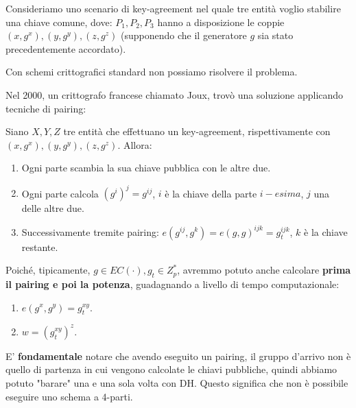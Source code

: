 \begin{problem}[3-party DH] Consideriamo uno scenario di key-agreement nel quale tre entità voglio stabilire una chiave comune, dove:
$P_1,P_2,P_3$ hanno a disposizione le coppie $(x,g^x),(y,g^y),(z,g^z)$ (supponendo che il generatore $g$ sia stato precedentemente accordato).
\begin{note}
Con schemi crittografici standard non possiamo risolvere il problema.
\end{note}
Nel 2000, un crittografo francese chiamato Joux, trovò una soluzione applicando tecniche di pairing:
\begin{solution}
\begin{theorem}\label{thm:dh3}
Siano $X,Y,Z$ tre entità che effettuano un key-agreement, rispettivamente con  $(x,g^x),(y,g^y),(z,g^z)$. Allora:
\begin{enumerate}
    \item Ogni parte scambia la sua chiave pubblica con le altre due.
    \item Ogni parte calcola $(g^i)^j=g^{ij}$, $i$ è la chiave della parte $i-esima$, $j$ una delle altre due.
    \item Successivamente tremite pairing: $e(g^{ij},g^k)=e(g,g)^{ijk}=g_t^{ijk}$, $k$ è la chiave restante.
\end{enumerate}
\begin{remark}
Poiché, tipicamente, $g\in{EC(\cdot)},g_t\in{Z_p^*}$, avremmo potuto anche calcolare \textbf{prima il pairing e poi la potenza}, guadagnando a livello di tempo computazionale:
\begin{enumerate}
    \item $e(g^x,g^y)=g_t^{xy}$.
    \item $w=(g_t^{xy})^z$.
\end{enumerate}
\end{remark}
\end{theorem}
\end{solution}
\begin{note}
E' \textbf{fondamentale} notare che avendo eseguito un pairing, il gruppo d'arrivo non è quello di partenza in cui vengono calcolate le chiavi pubbliche, quindi abbiamo potuto "barare" una e una sola volta con DH. Questo significa che non è possibile eseguire uno schema a 4-parti.
\end{note}
\end{problem}
